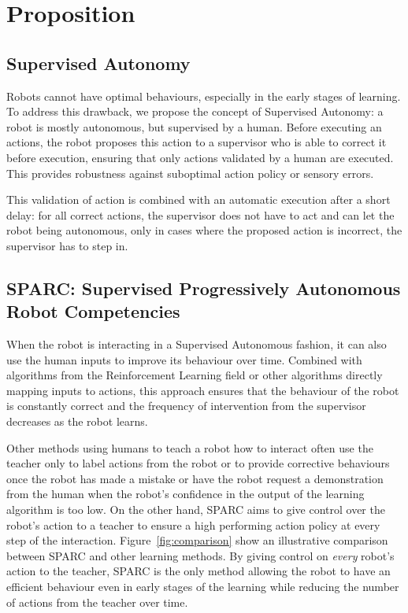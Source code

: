 \documentclass[conference]{IEEEtran}
\begin{document}
\section{Proposition}

\subsection{Supervised Autonomy}

Robots cannot have optimal behaviours, especially in the early stages of
learning. To address this drawback, we propose the concept of Supervised
Autonomy: a robot is mostly autonomous, but supervised by a human. Before
executing an actions, the robot proposes this action to a supervisor who is able
to correct it before execution, ensuring that only actions validated by a human
are executed. This provides robustness against suboptimal action policy or sensory
errors.

This validation of action is combined with an automatic execution after a short
delay: for all correct actions, the supervisor does not have to act and can let
the robot being autonomous, only in cases where the proposed action is
incorrect, the supervisor has to step in.

\subsection{SPARC: Supervised Progressively Autonomous Robot Competencies}

When the robot is interacting in a Supervised Autonomous fashion, it can also
use the human inputs to improve its behaviour over time. Combined with
algorithms from the Reinforcement Learning field or other algorithms directly
mapping inputs to actions, this approach ensures that the behaviour of the robot
is constantly correct and the frequency of intervention from the supervisor
decreases as the robot learns.

Other methods using humans to teach a robot how to interact often use the
teacher only to label actions from the robot or to provide corrective behaviours
once the robot has made a mistake or have the robot request a demonstration from
the human when the robot's confidence in the output of the learning algorithm is too
low.  On the other hand, SPARC aims to give control over the robot's action to a
teacher to ensure a high performing action policy at every step of the
interaction.  Figure~\ref{fig:comparison} show an illustrative comparison
between SPARC and other learning methods. By giving control on \emph{every}
robot's action to the teacher, SPARC is the only method allowing the robot to
have an efficient behaviour even in early stages of the learning while reducing
the number of actions from the teacher over time.
\end{document}
